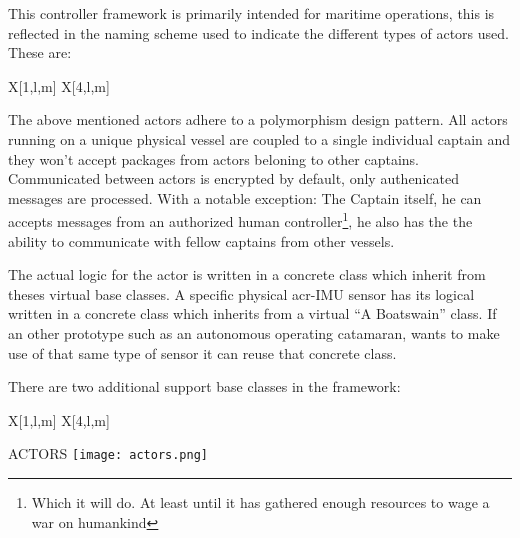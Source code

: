 \noindent This controller framework is primarily intended for maritime operations, this is reflected in the naming scheme used to
indicate the different types of actors used. These are:

\begin{RoyalTable}{X[1,l,m] X[4,l,m]}
\end{RoyalTable}

The above mentioned actors adhere to a polymorphism design pattern. All actors running on a unique physical vessel are
coupled to a single individual captain and they won't accept packages from actors beloning to other captains.
Communicated between actors is encrypted by default, only authenicated messages are processed. With a notable exception:
The Captain itself, he can accepts messages from an authorized  human controller\footnote{Which it will do. At least
until it has gathered enough resources to wage a war on humankind}, he also has the the ability to communicate with
fellow captains from other vessels.

The actual logic for the actor is written in a concrete class which inherit from theses virtual base classes. A specific
physical \gls{acr-IMU} sensor has its logical written in a concrete class which inherits from a virtual ``A Boatswain''
class. If an other prototype such as an autonomous operating catamaran, wants to make use of that same type of sensor it
can reuse that concrete class.

\noindent There are two additional support base classes in the framework:

\begin{RoyalTable}{X[1,l,m] X[4,l,m]}
\end{RoyalTable}

\begin{RoyalFigure}[htb, label=fig:actors]{ACTORS}
	\texttt{[image: actors.png]}
\end{RoyalFigure}

